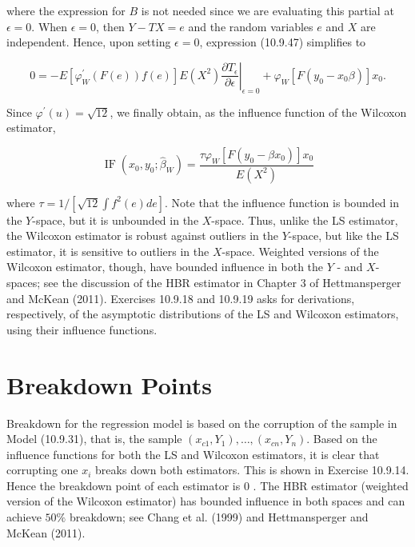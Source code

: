 where the expression for $B$ is not needed since we are evaluating this partial at $\epsilon=0$. When $\epsilon=0$, then $Y-T X=e$ and the random variables $e$ and $X$ are independent. Hence, upon setting $\epsilon=0$, expression (10.9.47) simplifies to


\begin{equation*}
0=-\left.E\left[\varphi_{W}^{\prime}(F(e)) f(e)\right] E\left(X^{2}\right) \frac{\partial T_{\epsilon}}{\partial \epsilon}\right|_{\epsilon=0}+\varphi_{W}\left[F\left(y_{0}-x_{0} \beta\right)\right] x_{0} . \tag{10.9.48}
\end{equation*}


Since $\varphi^{\prime}(u)=\sqrt{12}$, we finally obtain, as the influence function of the Wilcoxon estimator,


\begin{equation*}
\operatorname{IF}\left(x_{0}, y_{0} ; \widehat{\beta}_{W}\right)=\frac{\tau \varphi_{W}\left[F\left(y_{0}-\beta x_{0}\right)\right] x_{0}}{E\left(X^{2}\right)} \tag{10.9.49}
\end{equation*}


where $\tau=1 /\left[\sqrt{12} \int f^{2}(e) d e\right]$. Note that the influence function is bounded in the $Y$-space, but it is unbounded in the $X$-space. Thus, unlike the LS estimator, the Wilcoxon estimator is robust against outliers in the $Y$-space, but like the LS estimator, it is sensitive to outliers in the $X$-space. Weighted versions of the Wilcoxon estimator, though, have bounded influence in both the $Y$ - and $X$-spaces; see the discussion of the HBR estimator in Chapter 3 of Hettmansperger and McKean (2011). Exercises 10.9.18 and 10.9.19 asks for derivations, respectively, of the asymptotic distributions of the LS and Wilcoxon estimators, using their influence functions.

\section*{Breakdown Points}
Breakdown for the regression model is based on the corruption of the sample in Model (10.9.31), that is, the sample $\left(x_{c 1}, Y_{1}\right), \ldots,\left(x_{c n}, Y_{n}\right)$. Based on the influence functions for both the LS and Wilcoxon estimators, it is clear that corrupting one $x_{i}$ breaks down both estimators. This is shown in Exercise 10.9.14. Hence the breakdown point of each estimator is 0 . The HBR estimator (weighted version of the Wilcoxon estimator) has bounded influence in both spaces and can achieve $50 \%$ breakdown; see Chang et al. (1999) and Hettmansperger and McKean (2011).

